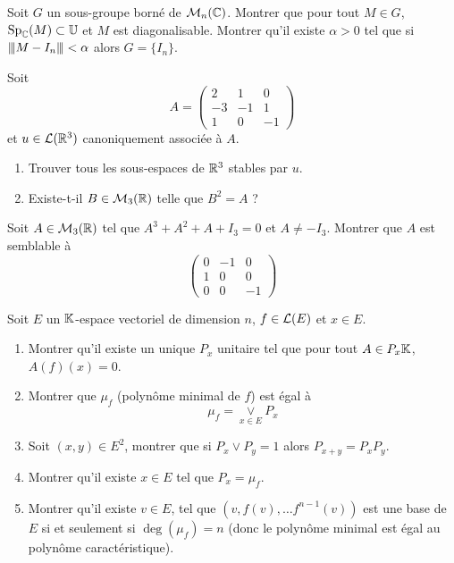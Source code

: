 \begin{exercise}
	Soit $G$ un sous-groupe borné de $\mathcal{M}_{n}(\mathbb{C})$. Montrer que pour tout $M\in G$, $\operatorname{Sp}_{\mathbb{C}}(M)\subset \mathbb{U}$ et $M$ est diagonalisable. Montrer qu'il existe $\alpha>0$ tel que si ${\left\vert\kern-0.25ex\left\vert\kern-0.25ex\left\vert{}M-I_{n} \right\vert\kern-0.25ex\right\vert\kern-0.25ex\right\vert}<\alpha$ alors $G=\{I_{n}\}$.
\end{exercise}

\begin{exercise}
	Soit 
	$$
	A=
	\begin{pmatrix}
		2 & 1 & 0\\
		-3 & -1 & 1\\
		1 & 0 & -1
	\end{pmatrix}
	$$
	et $u\in\mathcal{L}(\mathbb{R}^{3})$ canoniquement associée à $A$.
	\begin{enumerate}
		\item Trouver tous les sous-espaces de $\mathbb{R}^{3}$ stables par $u$.
		\item Existe-t-il $B\in\mathcal{M}_{3}(\mathbb{R})$ telle que $B^{2}=A$ ?
	\end{enumerate}
\end{exercise}

\begin{exercise}
	Soit $A\in\mathcal{M}_{3}(\mathbb{R})$ tel que $A^{3}+A^{2}+A+I_{3}=0$ et $A\neq -I_{3}$. Montrer que $A$ est semblable à
	$$
	\begin{pmatrix}
		0 & -1 & 0\\
		1 & 0 & 0\\
		0 & 0 & -1
	\end{pmatrix}
	$$
\end{exercise}

\begin{exercise}
	Soit $E$ un $\mathbb{K}$-espace vectoriel de dimension $n$, $f\in\mathcal{L}(E)$ et $x\in E$.
	\begin{enumerate}
		\item Montrer qu'il existe un unique $P_{x}$ unitaire tel que pour tout $A\in P_{x}\mathbb{K}$, $A(f)(x)=0$.
		\item Montrer que $\mu_{f}$ (polynôme minimal de $f$) est égal à 
		$$\mu_{f}=\underset{x\in E}{\vee}P_{x}$$
		\item Soit $(x,y)\in E^{2}$, montrer que si $P_{x}\vee P_{y}=1$ alors $P_{x+y}=P_{x}P_{y}$.
		\item Montrer qu'il existe $x\in E$ tel que $P_{x}=\mu_{f}$.
		\item Montrer qu'il existe $v\in E$, tel que $(v,f(v),\dots f^{n-1}(v))$ est une base de $E$ si et seulement si $\deg(\mu_{f})=n$ (donc le polynôme minimal est égal au polynôme caractéristique).
	\end{enumerate}
\end{exercise}

